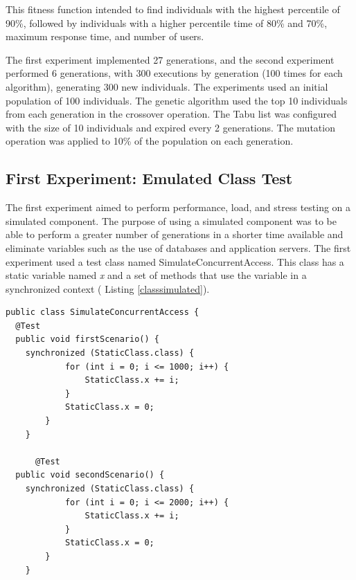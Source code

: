 \documentclass[conference]{IEEEtran}
\begin{document}
This fitness function intended to find individuals with the highest percentile of 90\%, followed by individuals with a higher percentile time of 80\% and 70\%, maximum response time, and number of users.

The first experiment implemented 27 generations, and the second experiment  performed 6 generations, with 300 executions by generation (100 times for each algorithm),  generating 300 new individuals. The experiments used an initial population of 100 individuals. The genetic algorithm used the top 10 individuals from each generation in the crossover operation. The Tabu list was configured with the size of 10 individuals and expired every 2 generations.  The mutation operation was applied to 10\% of the population on each generation. 

\subsection{First Experiment: Emulated Class Test}

The first experiment aimed to perform performance, load, and stress testing on a simulated component. The purpose of using a simulated component was to be able to perform a greater number of generations in a shorter time available and eliminate variables such as the use of databases and application servers. The first experiment used a test class  named SimulateConcurrentAccess. This class has a static variable named \textit{x} and a set of methods that use the variable in a synchronized context ( Listing \ref{classsimulated}).



\begin{lstlisting}[style=outline,caption={SimulateConcurrentAccess class},float,label=classsimulated]
public class SimulateConcurrentAccess {
  @Test
  public void firstScenario() {		
    synchronized (StaticClass.class) {
			for (int i = 0; i <= 1000; i++) {
				StaticClass.x += i;
			}
			StaticClass.x = 0;
		}
	}
	
	  @Test
  public void secondScenario() {		
    synchronized (StaticClass.class) {
			for (int i = 0; i <= 2000; i++) {
				StaticClass.x += i;
			}
			StaticClass.x = 0;
		}
	}
\end{lstlisting}
\end{document}
